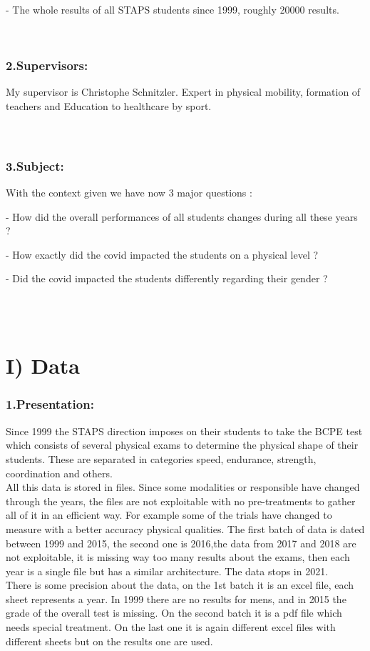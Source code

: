 \documentclass[
	12pt, %
]{fphw_assignment_toc}
\begin{document}
- The whole results of all STAPS students since 1999, roughly 20000 results.


\\
\subsubsection{\large\bf 2.Supervisors:}
\vspace{\dimexpr-40pt-\baselineskip+3cm}

My supervisor is Christophe Schnitzler. Expert in physical mobility, formation of teachers and Education to healthcare by sport.
\\
\\
\\
\subsubsection{\large\bf 3.Subject:}

With the context given we have now 3 major questions :

- How did the overall performances of all students changes during all these years ?

- How exactly did the covid impacted the students on a physical level ?

- Did the covid impacted the students differently regarding their gender ?


\\
\\
\newpage

\section{\large\bf I) Data~}
\subsubsection{\large\bf 1.Presentation: }


Since 1999 the STAPS direction imposes on their students to take the BCPE test which consists of several physical exams to determine the physical shape of their students. These are separated in categories speed, endurance, strength, coordination and others. 
\\
All this data is stored in files. Since some modalities or responsible have changed through the years, the files are not exploitable with no pre-treatments to gather all of it in an efficient way. For example some of the trials have changed to measure with a better accuracy physical qualities. The first batch of data is dated between 1999  and 2015, the second one is 2016,the data from 2017 and 2018 are not exploitable, it is missing way too many results about the exams, then each year  is a single file but has a similar architecture. The data stops in 2021.
\\
There is some precision about the data, on the 1st batch it is an excel file, each sheet represents a year. In 1999 there are no results for mens, and in 2015 the grade of the overall test is missing. 
On the second batch it is a pdf file which needs special treatment.
On the last one it is again different excel files with different sheets but  on the results one are used.
\end{document}
